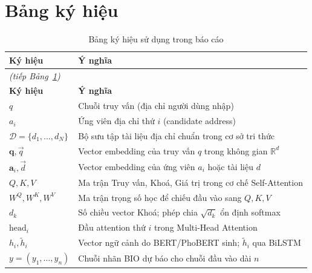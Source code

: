\chapter*{Bảng ký hiệu}

\begin{longtable}{p{4cm} p{10.4cm}}
\caption{Bảng ký hiệu sử dụng trong báo cáo}\label{tab:notation}\\
\toprule
\textbf{Ký hiệu} & \textbf{Ý nghĩa} \\
\midrule
\endfirsthead

\multicolumn{2}{l}{\small\textit{(tiếp Bảng~\ref{tab:notation})}}\\
\toprule
\textbf{Ký hiệu} & \textbf{Ý nghĩa} \\
\midrule
\endhead

$q$
& Chuỗi truy vấn (địa chỉ người dùng nhập) \\

$a_i$
& Ứng viên địa chỉ thứ $i$ (candidate address) \\

$\mathcal{D} = \{d_1, \dots, d_N\}$
& Bộ sưu tập tài liệu địa chỉ chuẩn trong cơ sở tri thức \\

$\mathbf{q}, \vec{q}$
& Vector embedding của truy vấn $q$ trong không gian $\mathbb{R}^d$ \\

$\mathbf{a}_i, \vec{d}$
& Vector embedding của ứng viên $a_i$ hoặc tài liệu $d$ \\

$Q, K, V$
& Ma trận Truy vấn, Khoá, Giá trị trong cơ chế Self-Attention \\

$W^Q, W^K, W^V$
& Ma trận trọng số học để chiếu đầu vào sang $Q, K, V$ \\

$d_k$
& Số chiều vector Khoá; phép chia $\sqrt{d_k}$ ổn định softmax \\

$\mathrm{head}_i$
& Đầu attention thứ $i$ trong Multi-Head Attention \\

$h_i, \tilde{h}_i$
& Vector ngữ cảnh do BERT/PhoBERT sinh; $\tilde{h}_i$ qua BiLSTM \\

$y = (y_1, \dots, y_n)$
& Chuỗi nhãn BIO dự báo cho chuỗi đầu vào dài $n$ \\


\end{longtable}
